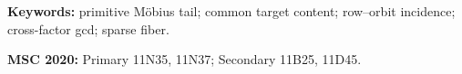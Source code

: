 \documentclass[11pt]{article}
\theoremstyle{definition}
\theoremstyle{remark}
\begin{document}
\noindent\textbf{Keywords:} primitive M\"obius tail; common target
content; row--orbit incidence; cross-factor gcd; sparse fiber.

\medskip
\noindent\textbf{MSC 2020:} Primary 11N35, 11N37; Secondary
11B25, 11D45.










\clearpage
\begingroup
\footnotesize


\endgroup
\end{document}
